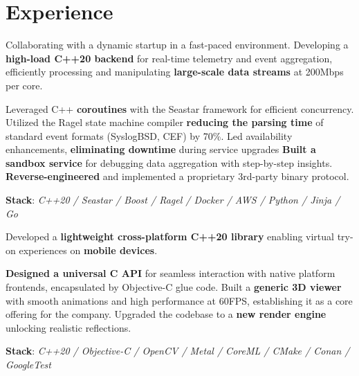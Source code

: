 \documentclass[]{deedy-resume}
\begin{document}
\begin{minipage}[t]{0.70\textwidth}


\section{Experience}


Collaborating with a dynamic startup in a fast-paced environment.
Developing a \textbf{high-load C++20 backend} for real-time telemetry and event aggregation, efficiently processing and manipulating \textbf{large-scale data streams} at 200Mbps per core.
\begin{descritemize}
    \descritem Leveraged C++ \textbf{coroutines} with the Seastar framework for efficient concurrency.
    \descritem Utilized the Ragel state machine compiler \textbf{reducing the parsing time} of standard event formats (SyslogBSD, CEF) by 70\%.
    \descritem Led availability enhancements, \textbf{eliminating downtime} during service upgrades
    \descritem \textbf{Built a sandbox service} for debugging data aggregation with step-by-step insights.
    \descritem \textbf{Reverse-engineered} and implemented a proprietary 3rd-party binary protocol.
\end{descritemize}
\textbf{Stack}: \textit{C++20 / Seastar / Boost / Ragel / Docker / AWS / Python / Jinja / Go}

\sectionspace



Developed a \textbf{lightweight cross-platform C++20 library} enabling virtual try-on experiences on \textbf{mobile devices}.
\begin{descritemize}
    \descritem \textbf{Designed a universal C API} for seamless interaction with native platform frontends, encapsulated by Objective-C glue code. 
    \descritem Built a \textbf{generic 3D viewer} with smooth animations and high performance at 60FPS, establishing it as a core offering for the company.
    \descritem Upgraded the codebase to a \textbf{new render engine} unlocking realistic reflections.
\end{descritemize}
\textbf{Stack}: \textit{C++20 / Objective-C / OpenCV / Metal / CoreML / CMake / Conan / GoogleTest}


\end{minipage}
\end{document}
